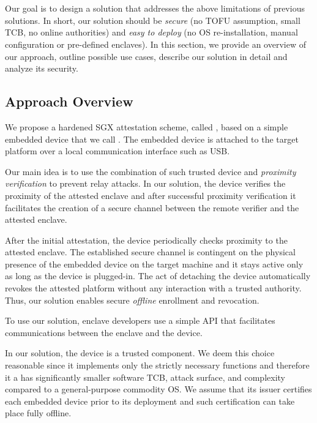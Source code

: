 \section{\name}
\label{sec:systemDesignMain}

Our goal is to design a solution that addresses the above limitations of previous solutions. In short, our solution should be \emph{secure} (no TOFU assumption, small TCB, no online authorities) and \emph{easy to deploy} (no OS re-installation, manual configuration or pre-defined enclaves). In this section, we provide an overview of our approach, outline possible use cases, describe our solution in detail and analyze its security.

\subsection{Approach Overview}

We propose a hardened SGX attestation scheme, called \name, based on a simple embedded device that we call \device. The embedded device is attached to the target platform over a local communication interface such as USB. 


Our main idea is to use the combination of such trusted device and \emph{proximity verification} to prevent relay attacks. In our solution, the \device device verifies the proximity of the attested enclave and after successful proximity verification it facilitates the creation of a secure channel between the remote verifier and the attested enclave. 

After the initial attestation, the device periodically checks proximity to the attested enclave. The established secure channel is contingent on the physical presence of the embedded device on the target machine and it stays active only as long as the device is plugged-in. The act of detaching the device automatically revokes the attested platform without any interaction with a trusted authority. Thus, our solution enables secure \emph{offline} enrollment and revocation. 

To use our solution, enclave developers use a simple API that facilitates communications between the enclave and the device. 


In our solution, the \device device is a trusted component. We deem this choice reasonable since it implements only the strictly necessary functions and therefore it a has significantly smaller software TCB, attack surface, and complexity compared to a general-purpose commodity OS. We assume that its issuer certifies each embedded device prior to its deployment and such certification can take place fully offline.

